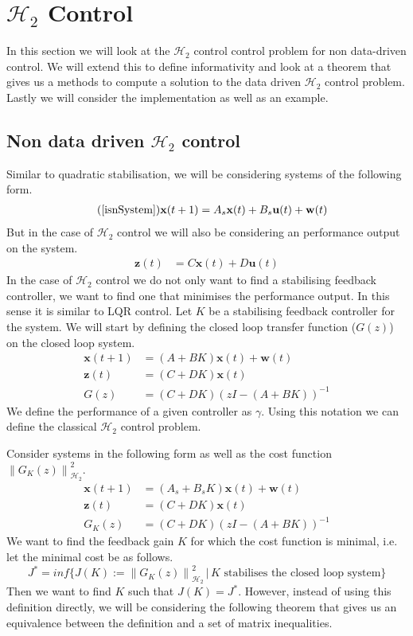 \section{$\mathcal{H}_2$ Control}
In this section we will look at the $\mathcal{H}_2$ control control problem for non data-driven control. We will extend this to define informativity and look at a theorem that gives us a methods to compute a solution to the data driven $\mathcal{H}_2$ control problem. Lastly we will consider the implementation as well as an example.

\subsection{Non data driven $\mathcal{H}_2$ control}
Similar to quadratic stabilisation, we will be considering systems of the following form.
\begin{align} \tag{\ref{isnSystem}}
\mathbf{x}(t+1) &= A_s \mathbf{x}(t) + B_s \mathbf{u}(t) + \mathbf{w}(t)
\end{align}
But in the case of $\mathcal{H}_2$ control we will also be considering an performance output on the system.
\begin{align*}
	\mathbf{z}(t) &= C \mathbf{x}(t) + D \mathbf{u}(t)
\end{align*}
In the case of $\mathcal{H}_2$ control we do not only want to find a stabilising feedback controller, we want to find one that minimises the performance output. In this sense it is similar to LQR control. Let $K$ be a stabilising feedback controller for the system. We will start by defining the closed loop transfer function ($G(z)$) on the closed loop system.
\begin{align*}
	\mathbf{x}(t+1) &= (A + B K) \mathbf{x}(t) + \mathbf{w}(t) \\
	\mathbf{z}(t)   &= (C   + D   K) \mathbf{x}(t) \\
	G(z) &= (C + DK)(z I - (A+BK))^{-1}
\end{align*}
We define the performance of a given controller as $\gamma$. Using this notation we can define the classical $\mathcal{H}_2$ control problem.

\cite[Problem 11.1]{bookTrentelman} Consider systems in the following form as well as the cost function $\left\| G_K(z) \right\|^2_{\mathcal{H}_2}$.
\begin{align*}
	\mathbf{x}(t+1) &= (A_s + B_s K) \mathbf{x}(t) + \mathbf{w}(t) \\
	\mathbf{z}(t)   &= (C   + D   K) \mathbf{x}(t) \\
	G_K(z) &= (C + DK)(z I - (A+BK))^{-1}
\end{align*}
We want to find the feedback gain $K$ for which the cost function is minimal, i.e. let the minimal cost be as follows.
\begin{equation*}
	J^\ast = inf \{ J(K) := \left\| G_K(z) \right\|^2_{\mathcal{H}_2} \, | \, K \mbox{ stabilises the closed loop system}\}
\end{equation*}
Then we want to find $K$ such that $J(K) = J^\ast$. However, instead of using this definition directly, we will be considering the following theorem that gives us an equivalence between the definition and a set of matrix inequalities.

